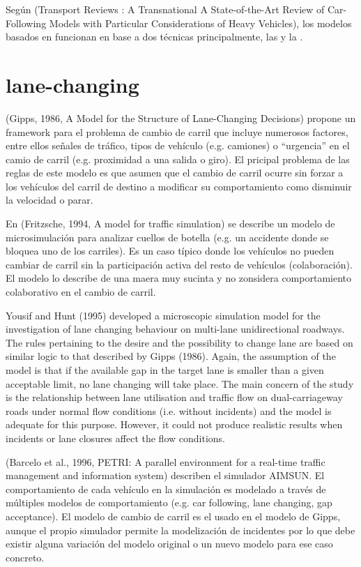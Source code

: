 Según (Transport Reviews : A Transnational A State-of-the-Art Review of Car- Following Models with Particular Considerations of Heavy Vehicles), los modelos basados en  funcionan en base a dos técnicas principalmente, las  y la .

\section{lane-changing}

(Gipps, 1986, A Model for the Structure of Lane-Changing Decisions) propone un framework para el problema de cambio de carril que incluye numerosos factores, entre ellos señales de tráfico, tipos de vehículo (e.g. camiones) o \enquote{urgencia} en el camio de carril (e.g. proximidad a una salida o giro). El pricipal problema de las reglas de este modelo es que asumen que el cambio de carril ocurre sin forzar a los vehículos del carril de destino a modificar su comportamiento como disminuir la velocidad o parar.

En (Fritzsche, 1994, A model for traffic simulation) se describe un modelo de microsimulación para analizar cuellos de botella (e.g. un accidente donde se bloquea uno de los carriles). Es un caso típico donde los vehículos no pueden cambiar de carril sin la participación activa del resto de vehículos (colaboración). El modelo lo describe de una maera muy sucinta y no zonsidera comportamiento colaborativo en el cambio de carril.

Yousif and Hunt (1995) developed a microscopic simulation model for the investigation of lane changing behaviour on multi-lane unidirectional roadways. The rules pertaining to the desire and the possibility to change lane are based on similar logic to that described by Gipps (1986). Again, the assumption of the model is that if the available gap in the target lane is smaller than a given acceptable limit, no lane changing will take place. The main concern of the study is the relationship between lane utilisation and traffic flow on dual-carriageway roads under normal flow conditions (i.e. without incidents) and the model is adequate for this purpose. However, it could not produce realistic results when incidents or lane closures affect the flow conditions.

(Barcelo et al., 1996, PETRI: A parallel environment for a real-time traffic management and information system) describen el simulador AIMSUN. El comportamiento de cada vehículo en la simulación es modelado a través de múltiples modelos de comportamiento (e.g. car following, lane changing, gap acceptance). El modelo de cambio de carril es el usado en el modelo de Gipps, aunque el propio simulador permite la modelización de incidentes por lo que debe existir alguna variación del modelo original o un nuevo modelo para ese caso concreto.

